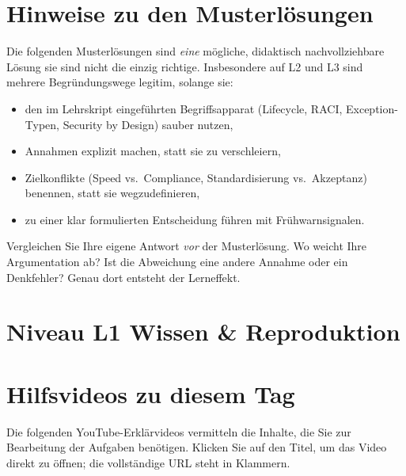 \documentclass[11pt,a4paper,oneside]{article}
\begin{document}
\section*{Hinweise zu den Musterl\"osungen}
\thispagestyle{plain}

\noindent Die folgenden Musterl\"osungen sind \emph{eine} m\"ogliche, didaktisch nachvollziehbare L\"osung \textendash{} sie sind nicht die einzig richtige. Insbesondere auf L2 und L3 sind mehrere Begr\"undungswege legitim, solange sie:

\begin{itemize}
  \item den im Lehrskript eingef\"uhrten Begriffsapparat (Lifecycle, RACI, Exception-Typen, Security by Design) sauber nutzen,
  \item Annahmen explizit machen, statt sie zu verschleiern,
  \item Zielkonflikte (Speed vs.\ Compliance, Standardisierung vs.\ Akzeptanz) benennen, statt sie wegzudefinieren,
  \item zu einer klar formulierten Entscheidung f\"uhren \textendash{} mit Fr\"uhwarnsignalen.
\end{itemize}

\begin{infobox}
Vergleichen Sie Ihre eigene Antwort \emph{vor} der Musterl\"osung. Wo weicht Ihre Argumentation ab? Ist die Abweichung eine andere Annahme \textendash{} oder ein Denkfehler? Genau dort entsteht der Lerneffekt.
\end{infobox}

\clearpage

\section*{Niveau L1 \textendash{} Wissen \& Reproduktion}

\section*{Hilfsvideos zu diesem Tag}
\thispagestyle{plain}

\noindent Die folgenden YouTube-Erkl\"arvideos vermitteln die Inhalte, die Sie zur Bearbeitung der Aufgaben ben\"otigen. Klicken Sie auf den Titel, um das Video direkt zu \"offnen; die vollst\"andige URL steht in Klammern.
\end{document}
